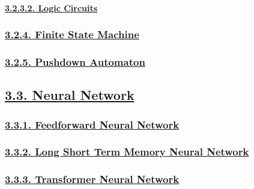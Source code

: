 \documentclass[
]{article}
\begin{document}
\hypertarget{logic-circuits}{%
\paragraph{\texorpdfstring{\protect\hyperlink{logic-circuits-1}{3.2.3.2.
Logic Circuits}}{3.2.3.2. Logic Circuits}}\label{logic-circuits}}

\hypertarget{finite-state-machine}{%
\subsubsection{\texorpdfstring{\protect\hyperlink{finite-state-machine-1}{3.2.4.
Finite State
Machine}}{3.2.4. Finite State Machine}}\label{finite-state-machine}}

\hypertarget{pushdown-automaton}{%
\subsubsection{\texorpdfstring{\protect\hyperlink{pushdown-automaton-1}{3.2.5.
Pushdown
Automaton}}{3.2.5. Pushdown Automaton}}\label{pushdown-automaton}}

\hypertarget{neural-network}{%
\subsection{\texorpdfstring{\protect\hyperlink{neural-network-1}{3.3.
Neural Network}}{3.3. Neural Network}}\label{neural-network}}

\hypertarget{feedforward-neural-network}{%
\subsubsection{\texorpdfstring{\protect\hyperlink{feedforward-neural-network-1}{3.3.1.
Feedforward Neural
Network}}{3.3.1. Feedforward Neural Network}}\label{feedforward-neural-network}}

\hypertarget{long-short-term-memory-neural-network}{%
\subsubsection{\texorpdfstring{\protect\hyperlink{long-short-term-memory-neural-network-1}{3.3.2.
Long Short Term Memory Neural
Network}}{3.3.2. Long Short Term Memory Neural Network}}\label{long-short-term-memory-neural-network}}

\hypertarget{transformer-neural-network}{%
\subsubsection{\texorpdfstring{\protect\hyperlink{transformer-neural-network-1}{3.3.3.
Transformer Neural
Network}}{3.3.3. Transformer Neural Network}}\label{transformer-neural-network}}
\end{document}
